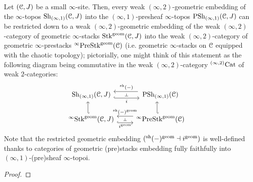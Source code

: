                 \begin{theorem} \label{theorem: (infinity,1)_sheafification_of_derived_geometric_prestacks}
                    Let $(\mathcal{C}, J)$ be a small $\infty$-site. Then, every weak $(\infty, 2)$-geometric embedding of the $\infty$-topos $\mathrm{Sh}_{(\infty, 1)}(\mathcal{C}, J)$ into the $(\infty, 1)$-presheaf $\infty$-topos $\mathrm{PSh}_{(\infty, 1)}(\mathcal{C}, J)$ can be restricted down to a weak $(\infty, 2)$-geometric embedding of the weak $(\infty, 2)$-category of geometric $\infty$-stacks $\mathrm{Stk}^{\mathrm{geom}}(\mathcal{C}, J)$ into the weak $(\infty, 2)$-category of geometric $\infty$-prestacks ${}^{\infty}\mathrm{Pre}\mathrm{Stk}^{\mathrm{geom}}(\mathcal{C})$ (i.e. geometric $\infty$-stacks on $\mathcal{C}$ equipped with the chaotic topology); pictorially, one might think of this statement as the following diagram being commutative in the weak $(\infty, 2)$-category ${}^{(\infty, 2)}\mathrm{Cat}$ of weak $2$-categories: 
                        $$
                            \begin{tikzcd}
                            	{\Sh_{(\infty, 1)}(\C, J)} & {\Psh_{(\infty, 1)}(\C)} \\
                            	{{}^{\infty}\Stk^{\geom}(\C, J)} & {{}^{\infty}\Pre\Stk^{\geom}(\C)}
                            	\arrow[""{name=0, anchor=center, inner sep=0}, "{{}^{\sh}(-)}"', shift right=2, shorten <=2pt, from=1-2, to=1-1]
                            	\arrow[""{name=1, anchor=center, inner sep=0}, "i"', shift right=2, hook, from=1-1, to=1-2]
                            	\arrow[shift left=2, hook', from=2-1, to=1-1]
                            	\arrow[shift left=2, hook', from=2-2, to=1-2]
                            	\arrow[""{name=2, anchor=center, inner sep=0}, "{i^{\geom}}"', shift right=2, hook, from=2-1, to=2-2]
                            	\arrow[""{name=3, anchor=center, inner sep=0}, "{{}^{\sh}(-)^{\geom}}"', shift right=2, from=2-2, to=2-1]
                            	\arrow["\dashv"{anchor=center, rotate=-90}, draw=none, from=0, to=1]
                            	\arrow["\dashv"{anchor=center, rotate=-90}, draw=none, from=3, to=2]
                            \end{tikzcd}
                        $$
                    Note that the restricted geometric embedding $({}^{\mathrm{sh}}(-)^{\mathrm{geom}} \dashv i^{\mathrm{geom}})$ is well-defined thanks to categories of geometric (pre)stacks embedding fully faithfully into $(\infty, 1)$-(pre)sheaf $\infty$-topoi.
                \end{theorem}
                    \begin{proof}
                        
                    \end{proof}
            
